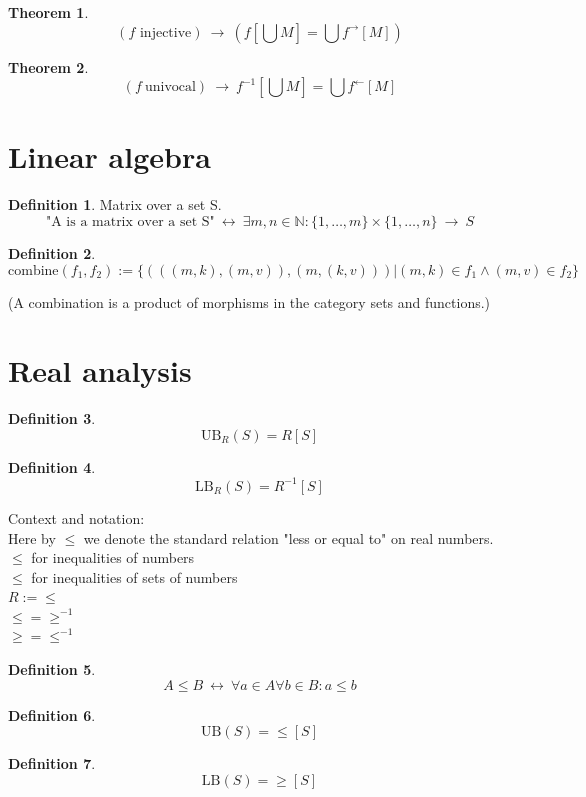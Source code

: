 \documentclass[10pt,a4paper]{article}
\theoremstyle{definition}
\newtheorem{definition}{Definition}[section]
\newtheorem{theorem}{Theorem}[section]
\renewcommand{\iff}{\ \longleftrightarrow\ }
\renewcommand{\implies}{\ \longrightarrow\ }
\newcommand{\injective}{\mbox{\ injective}}
\newcommand{\LB}{\mathrm{LB}}
\newcommand{\union}{\bigcup}
\newcommand{\univocal}{\mathrm{\ univocal}}
\newcommand{\UB}{\mathrm{UB}}
\begin{document}
\begin{theorem}
\[
(f\injective)
\implies
(f\left[\union M\right] = \union f^{\rightarrow}\left[M\right])
\]
\end{theorem}

\begin{theorem}
\[
(f\univocal)
\implies
f^{-1}\left[\union M\right] =\union f^{\leftarrow}\left[M\right]
\]
\end{theorem}
\section{Linear algebra}
\begin{definition}Matrix over a set S.
\[
\mbox{"A is a matrix over a set S"}
\iff
\exists m, n \in \mathbb{N}: \{1,\dots,m\}\times \{1,\dots,n\} \implies S \]
\end{definition}

\begin{definition}
\[
\mbox{combine}(f_1,f_2) := \{(((m,k),(m,v)),(m,(k,v)))| (m,k)\in f_1 \land (m,v)\in f_2\}
\]
\end{definition}
(A combination is a product of morphisms in the category sets and functions.)

\section{Real analysis}
\begin{definition}
\[
\UB_R(S) = R[S]
\]
\end{definition}
\begin{definition}
\[\LB_R(S) = R^{-1}[S]\]
\end{definition}

Context and notation:\\
Here by $\leq$ we denote the standard relation "less or equal to" on real numbers.
$\leq$ for inequalities of numbers\\
$\leqslant$ for inequalities of sets of numbers\\
$R := \leq$\\
$\leq = \geq^{-1}$\\
$\geq = \leq^{-1}$\\

\noindent

\begin{definition}
\[
A \leqslant B
\iff
\forall a\in A \forall b\in B: a\leq b
\]
\end{definition}
\begin{definition}
\[
\UB(S) = \leq [S]
\]
\end{definition}
\begin{definition}
\[
\LB(S) = \geq [S]
\]
\end{definition}
\end{document}
